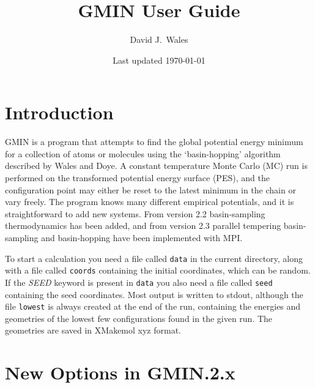 \documentclass[12pt,a4paper,dvips]{article}
\begin{document}
\title{GMIN User Guide}
\author{David J.~Wales}
\date{Last updated \today}
\maketitle

\clearpage
{}
{} %
\tableofcontents
\section{Introduction}

GMIN is a program that attempts to find the global potential energy minimum
for a collection of atoms or molecules using the `basin-hopping' algorithm
described by Wales and Doye.\cite{walesd97a}
A constant temperature Monte Carlo (MC) run is performed on the transformed
potential energy surface (PES), and the configuration point may either be reset 
to the latest minimum in the chain or vary freely.
The program knows many different empirical potentials, and it is straightforward to add new systems.
From version 2.2 basin-sampling thermodynamics has been added, and from 
version 2.3 parallel tempering basin-sampling and basin-hopping have been
implemented with MPI.

To start a calculation you need a file called {\tt data} in the current directory,
along with a file called {\tt coords} containing the initial coordinates,
which can be random. If the {\it SEED} keyword is present in
{\tt data} you also need a file called {\tt seed} containing the seed coordinates.
Most output is written to stdout, although the file {\tt lowest} is always created
at the end of the run, containing the energies and geometries of the lowest few
configurations found in the given run. The geometries are saved in XMakemol xyz format.

\section{New Options in GMIN.2.x}
\end{document}
